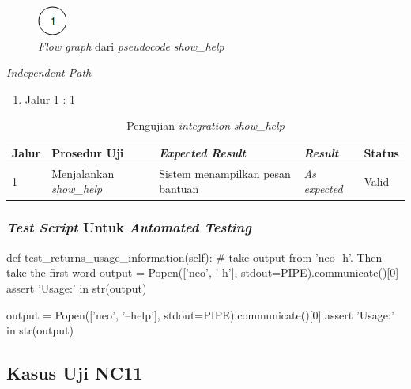 \begin{figure}[H]
  \centering
  \includegraphics[width=.06\linewidth]{img/test-case/1node}
  \caption{\emph{Flow graph} dari \emph{pseudocode} \emph{show\_help}}
  \label{cfg:show_help}
\end{figure}

\noindent
\emph{Independent Path}

\begin{enumerate}
\item Jalur 1 : 1
\end{enumerate}

\begin{longtable}{|P{.06\textwidth}|P{.29\textwidth}|P{.29\textwidth}|P{.12\textwidth}|P{.08\textwidth}|}
  \caption{Pengujian \emph{integration} \emph{show\_help}} \label{jalur:show-help}\\
  \hline
  \textbf{Jalur} & \textbf{Prosedur Uji} & \textbf{\emph{Expected Result}}
  & \textbf{\emph{Result}} & \textbf{Status} \\\hline
  1 & Menjalankan \emph{show\_help} & Sistem menampilkan pesan bantuan & \emph{As expected} & Valid \\\hline
\end{longtable}

\subsubsection{\emph{Test Script} Untuk \emph{Automated Testing}}

\begin{code}
\begin{ignasicblock}[title=test\_returns\_usage\_information,minted language=Python]
def test_returns_usage_information(self):
        # take output from 'neo -h'. Then take the first word
        output = Popen(['neo', '-h'], stdout=PIPE).communicate()[0]
        assert 'Usage:' in str(output)

        output = Popen(['neo', '--help'], stdout=PIPE).communicate()[0]
        assert 'Usage:' in str(output)
\end{ignasicblock}
  \label{ts:show-help}
\end{code}

\subsection{Kasus Uji NC11}

